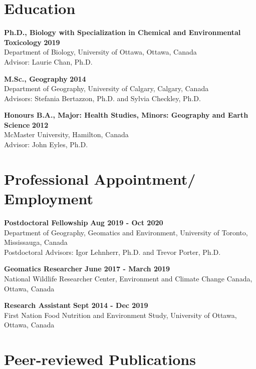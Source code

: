 \documentclass[margin,line]{res}
\begin{document}
\begin{resume}
\section{\sc Education}

\textbf{Ph.D., Biology with Specialization in Chemical and Environmental Toxicology} \hfill {\bf 2019}\\
Department of Biology, University of Ottawa, Ottawa, Canada \\
Advisor: Laurie Chan, Ph.D.

\textbf{M.Sc., Geography}  \hfill {\bf 2014}\\
Department of Geography, University of Calgary, Calgary, Canada\\
Advisors:  Stefania Bertazzon, Ph.D. and Sylvia Checkley, Ph.D.

\textbf{Honours B.A., Major: Health Studies, Minors: Geography and Earth Science }\hfill {\bf 2012}\\
McMaster University, Hamilton, Canada\\
Advisor: John Eyles, Ph.D.

\vspace*{.1in}
\section{\sc Professional Appointment/ Employment}
{\bf Postdoctoral Fellowship} \hfill {\bf Aug 2019 - Oct 2020}\\
Department of Geography, Geomatics and Environment, University of Toronto, Mississauga, Canada\\
Postdoctoral Advisors: Igor Lehnherr, Ph.D. and Trevor Porter, Ph.D.

{\bf Geomatics Researcher} \hfill {\bf June 2017 - March 2019}\\
National Wildlife Researcher Center, Environment and Climate Change Canada, Ottawa, Canada

{\bf Research Assistant} \hfill {\bf Sept 2014 - Dec 2019}\\
First Nation Food Nutrition and Environment Study, University of Ottawa, Ottawa, Canada

\vspace*{.1in}

\section{\sc Peer-reviewed Publications}


\end{resume}
\end{document}
